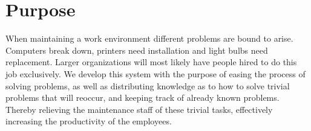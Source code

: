 \section{Purpose}
When maintaining a work environment different problems are bound to arise. Computers break down, printers need installation and light bulbs  need replacement. Larger organizations will most likely have people hired to do this job exclusively. We develop this system with the purpose of easing the process of solving problems, as well as distributing knowledge as to how to solve trivial problems that will reoccur, and keeping track of already known problems. Thereby relieving the maintenance staff of these trivial tasks, effectively increasing the productivity of the employees.
